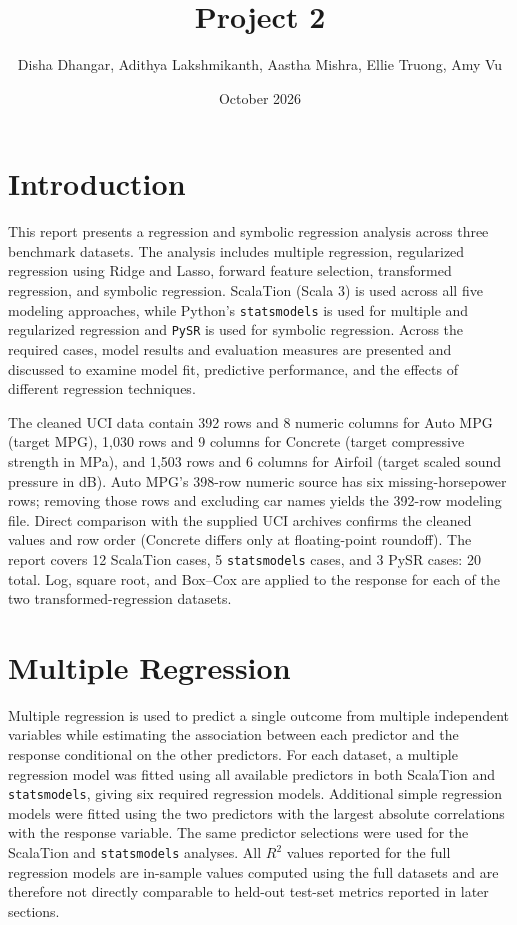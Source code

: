 \documentclass{article}
\title{Project 2}
\author{Disha Dhangar, Adithya Lakshmikanth, Aastha Mishra, Ellie Truong, Amy Vu}
\date{October 2026}
\begin{document}
\maketitle

\section{Introduction}

This report presents a regression and symbolic regression analysis across three benchmark datasets. The analysis includes multiple regression, regularized regression using Ridge and Lasso, forward feature selection, transformed regression, and symbolic regression. ScalaTion (Scala 3) is used across all five modeling approaches, while Python's \texttt{statsmodels} is used for multiple and regularized regression and \texttt{PySR} is used for symbolic regression. Across the required cases, model results and evaluation measures are presented and discussed to examine model fit, predictive performance, and the effects of different regression techniques.



The cleaned UCI data contain 392 rows and 8 numeric columns for Auto MPG (target MPG), 1,030 rows and 9 columns for Concrete (target compressive strength in MPa), and 1,503 rows and 6 columns for Airfoil (target scaled sound pressure in dB). Auto MPG's 398-row numeric source has six missing-horsepower rows; removing those rows and excluding car names yields the 392-row modeling file. Direct comparison with the supplied UCI archives confirms the cleaned values and row order (Concrete differs only at floating-point roundoff). The report covers 12 ScalaTion cases, 5 \texttt{statsmodels} cases, and 3 PySR cases: 20 total. Log, square root, and Box--Cox are applied to the response for each of the two transformed-regression datasets.

\section{Multiple Regression}

Multiple regression is used to predict a single outcome from multiple independent variables while estimating the association between each predictor and the response conditional on the other predictors. For each dataset, a multiple regression model was fitted using all available predictors in both ScalaTion and \texttt{statsmodels}, giving six required regression models. Additional simple regression models were fitted using the two predictors with the largest absolute correlations with the response variable. The same predictor selections were used for the ScalaTion and \texttt{statsmodels} analyses. All $R^2$ values reported for the full regression models are in-sample values computed using the full datasets and are therefore not directly comparable to held-out test-set metrics reported in later sections.
\end{document}
